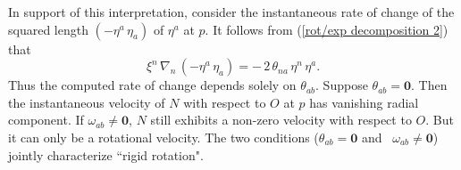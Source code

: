\documentclass [12] {article}
\theoremstyle{plain}
\numberwithin{figure}{subsection}
\numberwithin{proposition}{subsection}
\begin{document}
In support of this interpretation, consider the instantaneous rate of change of the squared length $(-\eta^a \, \eta_a)$ of $\eta^a$ at $p$. It follows from (\ref{rot/exp decomposition 2}) that
%
\begin{equation}\label{rateofexpansion}
\xi^n \, \nabla_n \, (-\eta^a \, \eta_a)  = - \, 2 \, \theta_{na}\,  \eta^n \, \eta^a. 
\end{equation} 
%
\noindent Thus the computed rate of change depends solely on $\theta_{ab}$. Suppose $\theta_{ab} = \textbf{0}$. Then the instantaneous velocity of $N$ with respect to $O$ at $p$ has vanishing radial component.  If $\omega_{ab} \neq \textbf{0}$, $N$ still exhibits a non-zero velocity with respect to $O$. But it can only be a rotational velocity. The two conditions ($\theta_{ab} = \textbf{0}$ and \, $\omega_{ab} \neq \textbf{0}$) jointly characterize ``rigid rotation". 
\end{document}
